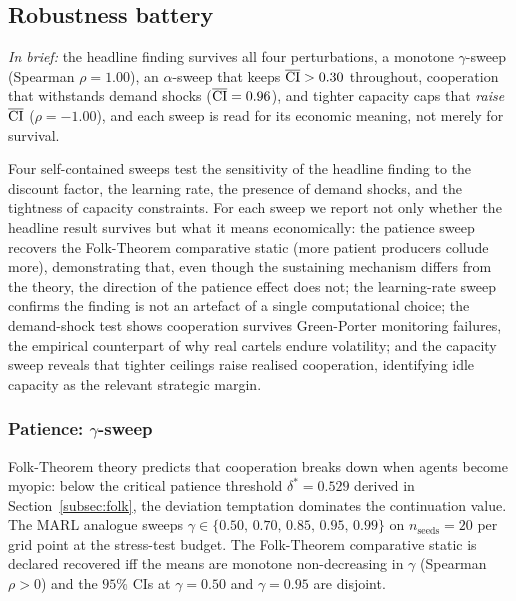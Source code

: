 \subsection{Robustness battery}
\label{subsec:robustness}

\emph{In brief:} the headline finding survives all four perturbations, a monotone $\gamma$-sweep (Spearman $\rho = 1.00$), an
$\alpha$-sweep that keeps $\overline{\mathrm{CI}} > 0.30$ throughout, cooperation that
withstands demand shocks ($\overline{\mathrm{CI}} = 0.96$), and tighter capacity caps that
\emph{raise} $\overline{\mathrm{CI}}$ ($\rho = -1.00$), and each sweep is read for its
economic meaning, not merely for survival.

Four self-contained sweeps test the sensitivity of the headline
finding to the discount factor, the learning rate, the presence
of demand shocks, and the tightness of capacity constraints. For
each sweep we report not only whether the headline result
survives but what it means economically: the patience sweep
recovers the Folk-Theorem comparative static (more patient
producers collude more), demonstrating that, even though the
sustaining mechanism differs from the theory, the
direction of the patience effect does not; the learning-rate
sweep confirms the finding is not an artefact of a single
computational choice; the demand-shock test shows cooperation
survives Green-Porter monitoring failures, the empirical
counterpart of why real cartels endure volatility; and the
capacity sweep reveals that tighter ceilings raise
realised cooperation, identifying idle capacity as the relevant
strategic margin.

\subsubsection{Patience: \texorpdfstring{$\gamma$}{gamma}-sweep}
\label{subsec:gamma}

Folk-Theorem theory predicts that cooperation breaks down when
agents become myopic: below the critical patience threshold
$\delta^\ast = 0.529$ derived in Section~\ref{subsec:folk}, the deviation
temptation dominates the continuation value. The MARL analogue
sweeps $\gamma \in \{0.50,\,0.70,\,0.85,\,0.95,\,0.99\}$ on
$n_{\text{seeds}} = 20$ per grid point at the stress-test
budget. The Folk-Theorem comparative static is declared
recovered iff the means are monotone non-decreasing in $\gamma$
(Spearman $\rho > 0$) and the $95\%$ CIs at $\gamma = 0.50$
and $\gamma = 0.95$ are disjoint.

